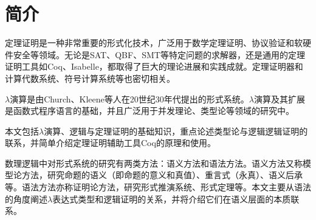 \section{简介}

定理证明是一种非常重要的形式化技术，广泛用于数学定理证明、协议验证和软硬件安全等领域。无论是SAT、QBF、SMT等特定问题的求解器，还是通用的定理证明工具如Coq、Isabelle，都取得了巨大的理论进展和实践成就。定理证明器和计算代数系统、符号计算系统等也密切相关。

$\lambda$演算是由Church、Kleene等人在20世纪30年代提出的形式系统。$\lambda$演算及其扩展是函数式程序语言的基础，并且广泛用于并发理论、类型论等领域的研究中。

本文包括$\lambda$演算、逻辑与定理证明的基础知识，重点论述类型论与逻辑逻辑证明的联系，并简单介绍定理证明辅助工具Coq的原理和使用。



数理逻辑中对形式系统的研究有两类方法：语义方法和语法方法。语义方法又称模型论方法，研究命题的语义（即命题的意义和真值）、重言式（永真）、语义后承等。语法方法亦称证明论方法，研究形式推演系统、形式定理等。本文主要从语法的角度阐述$\lambda$表达式类型和逻辑证明的关系，并将介绍它们在语义层面的本质联系。



